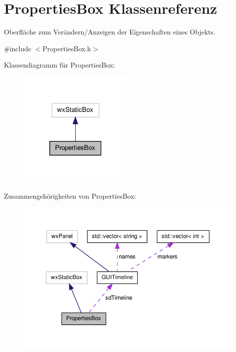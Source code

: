 \hypertarget{classPropertiesBox}{\section{Properties\-Box Klassenreferenz}
\label{classPropertiesBox}
}


Oberfläche zum Verändern/\-Anzeigen der Eigenschaften eines Objekts.  




{\ttfamily \#include $<$Properties\-Box.\-h$>$}



Klassendiagramm für Properties\-Box\-:\nopagebreak
\begin{figure}[H]
\begin{center}
\leavevmode
\includegraphics[width=158pt]{classPropertiesBox__inherit__graph}
\end{center}
\end{figure}


Zusammengehörigkeiten von Properties\-Box\-:
\nopagebreak
\begin{figure}[H]
\begin{center}
\leavevmode
\includegraphics[width=350pt]{classPropertiesBox__coll__graph}
\end{center}
\end{figure}
